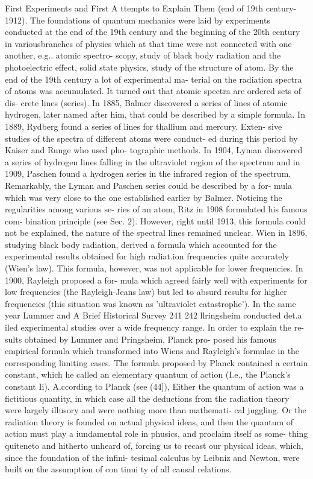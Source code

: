 \documentclass[a4paper,sfsidenotes,colorlinks=true]{tufte-book}
\numberwithin{equation}{section}
\numberwithin{figure}{section}
\begin{document}
{{{{{{First Experiments and First A ttempts to Explain Them (end of 19th century-1912). The foundations of quantum mechanics were laid by experiments conducted at the end of the 19th century and the beginning of the 20th century in variousbranches of physics which at that time were not connected with one another, e.g.. atomic spectro- scopy, study of black body radiation and the photoelectric effect, solid state physics, study of the structure of atom. By the end of the 19th century a lot of experimental ma- terial on the radiation spectra of atoms was accumulated. It turned out that atomic spectra are ordered sets of dis- crete lines (series). In 1885, Balmer discovered a series of lines of atomic hydrogen, later named after him, that could be described by a simple formula. In 1889, Rydberg found a series of lines for thallium and mercury. Exten- sive studies of the spectra of different atoms were conduct- ed during this period by Kaiser and Runge who used pho- tographic methods. In 1904, Lyman discovered a series of hydrogen lines falling in the ultraviolet region of the spectrum and in 1909, Paschen found a hydrogen series in the infrared region of the spectrum. Remarkably, the Lyman and Paschen series could be described by a for- mula which was very close to the one established earlier by Balmer. Noticing the regularities among various se- ries of an atom, Ritz in 1908 formulated his famous com- bination principle (see Sec. 2). However, right until 1913, this formula could not be explained, the nature of the spectral lines remained unclear.
Wien in 1896, studying black body radiation, derived a formula which accounted for the experimental results obtained for high radiat.ion frequencies quite accurately (Wien's law). This formula, however, was not applicable for lower frequencies. In 1900, Rayleigh proposed a for- mula which agreed fairly well with experiments for low frequencies (the Rayleigh-Jeans law) but led to absurd results for higher frequencies (this situation was known as 'ultraviolet catastrophe'). In the same year Lummer and
A Brief Historical Survey	241
242
llringsheim	conducted	det.a iled	experimental	studies over a wide frequency range. In order to explain the re- sults obtained by Lummer and Pringsheim, Planck pro- posed his famous empirical formula which transformed into Wiens and Rayleigh's formulae in the corresponding limiting cases.
The formula proposed by Planck contained a certain constant, which he called an elementary quantum of action (I.e., the Planck's constant Ii). A.ccording to Planck (see (44]), Either the quantum of action was a fictitious quantity, in which case all the deductions from the radiation theory were largely illusory and were nothing more than mathemati- cal juggling. Or the radiation theory is founded on actual physical ideas, and then the quantum of action must play a iundamental role in phusics, and proclaim itself as some- thing quiteneto and hitherto unheard of, forcing us to recast our physical ideas, which, since the foundation of the infini- tesimal calculus by Leibniz and Newton, were built on the assumption of con tinui ty of all causal relations.
}}}}}}
\end{document}
